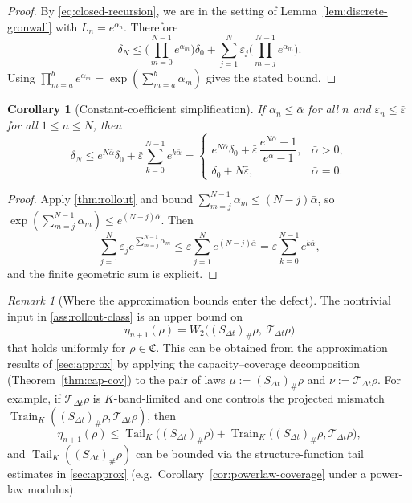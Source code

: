 \documentclass{article}
\numberwithin{equation}{section}
\theoremstyle{plain}
\newtheorem{corollary}[theorem]{Corollary}
\theoremstyle{definition}
\theoremstyle{remark}
\newtheorem{remark}[theorem]{Remark}
\newcommand{\Tail}{\operatorname{Tail}}
\DeclareMathOperator{\Train}{Train}
\begin{document}
\begin{proof}
By \eqref{eq:closed-recursion}, we are in the setting of Lemma~\ref{lem:discrete-gronwall} with
$L_n=e^{\alpha_n}$. Therefore
\[
\delta_N
\le
\Big(\prod_{m=0}^{N-1}e^{\alpha_m}\Big)\delta_0
+
\sum_{j=1}^{N}\varepsilon_j\Big(\prod_{m=j}^{N-1}e^{\alpha_m}\Big).
\]
Using $\prod_{m=a}^{b}e^{\alpha_m}=\exp(\sum_{m=a}^{b}\alpha_m)$ gives the stated bound.
\end{proof}

\begin{corollary}[Constant-coefficient simplification]
\label{cor:rollout-constant}
If $\alpha_n\le \bar\alpha$ for all $n$ and $\varepsilon_n\le \bar\varepsilon$ for all $1\le n\le N$, then
\[
\delta_N
\le
e^{N\bar\alpha}\delta_0
+
\bar\varepsilon\sum_{k=0}^{N-1}e^{k\bar\alpha}
=
\begin{cases}
e^{N\bar\alpha}\delta_0 + \bar\varepsilon\,\dfrac{e^{N\bar\alpha}-1}{e^{\bar\alpha}-1},
& \bar\alpha>0,\\[1.2ex]
\delta_0 + N\bar\varepsilon,
& \bar\alpha=0.
\end{cases}
\]
\end{corollary}

\begin{proof}
Apply \cref{thm:rollout} and bound $\sum_{m=j}^{N-1}\alpha_m\le (N-j)\bar\alpha$, so
$\exp(\sum_{m=j}^{N-1}\alpha_m)\le e^{(N-j)\bar\alpha}$. Then
\[
\sum_{j=1}^{N}\varepsilon_j e^{\sum_{m=j}^{N-1}\alpha_m}
\le
\bar\varepsilon\sum_{j=1}^{N}e^{(N-j)\bar\alpha}
=\bar\varepsilon\sum_{k=0}^{N-1}e^{k\bar\alpha},
\]
and the finite geometric sum is explicit.
\end{proof}

\begin{remark}[Where the approximation bounds enter the defect]
\label{rem:defect-via-approx}
The nontrivial input in \cref{ass:rollout-class} is an upper bound on
\[
\eta_{n+1}(\rho)=W_2\big((S_{\Delta t})_\#\rho,\ \mathcal T_{\Delta t}\rho\big)
\]
that holds uniformly for $\rho\in\mathfrak C$.
This can be obtained from the approximation results of \cref{sec:approx} by applying the
capacity--coverage decomposition (Theorem~\ref{thm:cap-cov}) to the pair of laws
$\mu:=(S_{\Delta t})_\#\rho$ and $\nu:=\mathcal T_{\Delta t}\rho$.
For example, if $\mathcal T_{\Delta t}\rho$ is $K$-band-limited and one controls the projected mismatch
$\Train_K((S_{\Delta t})_\#\rho,\mathcal T_{\Delta t}\rho)$, then
\[
\eta_{n+1}(\rho)\le \Tail_K\big((S_{\Delta t})_\#\rho\big)+
\Train_K\big((S_{\Delta t})_\#\rho,\mathcal T_{\Delta t}\rho\big),
\]
and $\Tail_K((S_{\Delta t})_\#\rho)$ can be bounded via the structure-function tail estimates in
\cref{sec:approx} (e.g.\ Corollary~\ref{cor:powerlaw-coverage} under a power-law modulus).
\end{remark}
\end{document}

